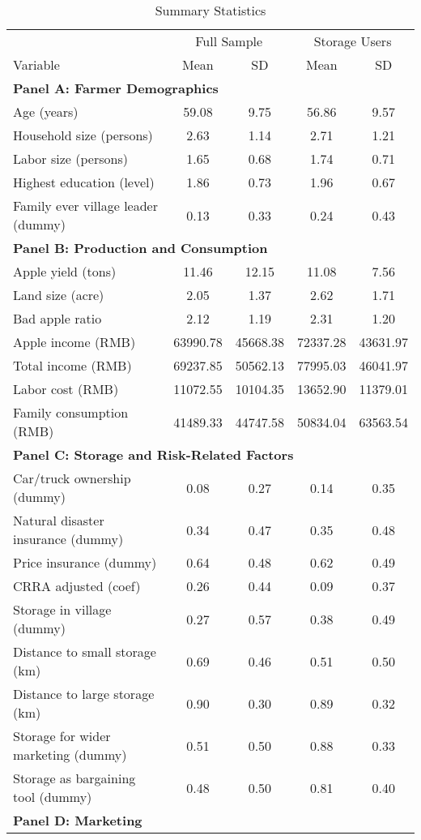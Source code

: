 \begin{table}[htbp]
\centering
\caption{Summary Statistics}
\label{tab: summary statistics}
\begin{tabular}{lcccc}
\hline
& \multicolumn{2}{c}{Full Sample} & \multicolumn{2}{c}{Storage Users} \\
\cline{2-3} \cline{4-5}
Variable & Mean & SD & Mean & SD \\
\hline
\multicolumn{5}{l}{\textbf{Panel A: Farmer Demographics}} \\

Age (years) & 59.08 & 9.75 & 56.86 & 9.57 \\ 
Household size (persons) & 2.63 & 1.14 & 2.71 & 1.21 \\ 
Labor size (persons) & 1.65 & 0.68 & 1.74 & 0.71 \\ 
Highest education (level) & 1.86 & 0.73 & 1.96 & 0.67 \\ 
Family ever village leader (dummy) & 0.13 & 0.33 & 0.24 & 0.43 \\ 
\hline
\multicolumn{5}{l}{\textbf{Panel B: Production and Consumption}} \\

Apple yield (tons) & 11.46 & 12.15 & 11.08 & 7.56 \\ 
Land size (acre) & 2.05 & 1.37 & 2.62 & 1.71 \\ 
Bad apple ratio & 2.12 & 1.19 & 2.31 & 1.20 \\ 
Apple income (RMB) & 63990.78 & 45668.38 & 72337.28 & 43631.97 \\ 
Total income (RMB) & 69237.85 & 50562.13 & 77995.03 & 46041.97 \\ 
Labor cost (RMB) & 11072.55 & 10104.35 & 13652.90 & 11379.01 \\ 
Family consumption (RMB) & 41489.33 & 44747.58 & 50834.04 & 63563.54 \\ 
\hline
\multicolumn{5}{l}{\textbf{Panel C: Storage and Risk-Related Factors}} \\

Car/truck ownership (dummy) & 0.08 & 0.27 & 0.14 & 0.35 \\ 
Natural disaster insurance (dummy) & 0.34 & 0.47 & 0.35 & 0.48 \\ 
Price insurance (dummy) & 0.64 & 0.48 & 0.62 & 0.49 \\ 
CRRA adjusted (coef) & 0.26 & 0.44 & 0.09 & 0.37 \\ 
Storage in village (dummy) & 0.27 & 0.57 & 0.38 & 0.49 \\ 
Distance to small storage (km) & 0.69 & 0.46 & 0.51 & 0.50 \\ 
Distance to large storage (km) & 0.90 & 0.30 & 0.89 & 0.32 \\ 
Storage for wider marketing (dummy) & 0.51 & 0.50 & 0.88 & 0.33 \\ 
Storage as bargaining tool (dummy) & 0.48 & 0.50 & 0.81 & 0.40 \\ 
\hline
\multicolumn{5}{l}{\textbf{Panel D: Marketing}} \\


\end{tabular}
\end{table}
